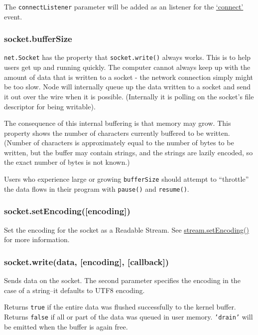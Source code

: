 The \texttt{connectListener} parameter will be added as an listener for
the \hyperref[netux5feventux5fconnect]{`connect'} event.

\subsubsection{socket.bufferSize}\label{socket.buffersize}

\texttt{net.Socket} has the property that \texttt{socket.write()} always
works. This is to help users get up and running quickly. The computer
cannot always keep up with the amount of data that is written to a
socket - the network connection simply might be too slow. Node will
internally queue up the data written to a socket and send it out over
the wire when it is possible. (Internally it is polling on the socket's
file descriptor for being writable).

The consequence of this internal buffering is that memory may grow. This
property shows the number of characters currently buffered to be
written. (Number of characters is approximately equal to the number of
bytes to be written, but the buffer may contain strings, and the strings
are lazily encoded, so the exact number of bytes is not known.)

Users who experience large or growing \texttt{bufferSize} should attempt
to ``throttle'' the data flows in their program with \texttt{pause()}
and \texttt{resume()}.

\subsubsection{socket.setEncoding({[}encoding{]})}\label{socket.setencodingencoding}

Set the encoding for the socket as a Readable Stream. See
\href{stream.html\#stream_stream_setencoding_encoding}{stream.setEncoding()}
for more information.

\subsubsection{socket.write(data, {[}encoding{]},
{[}callback{]})}\label{socket.writedata-encoding-callback}

Sends data on the socket. The second parameter specifies the encoding in
the case of a string--it defaults to UTF8 encoding.

Returns \texttt{true} if the entire data was flushed successfully to the
kernel buffer. Returns \texttt{false} if all or part of the data was
queued in user memory. \texttt{'drain'} will be emitted when the buffer
is again free.

